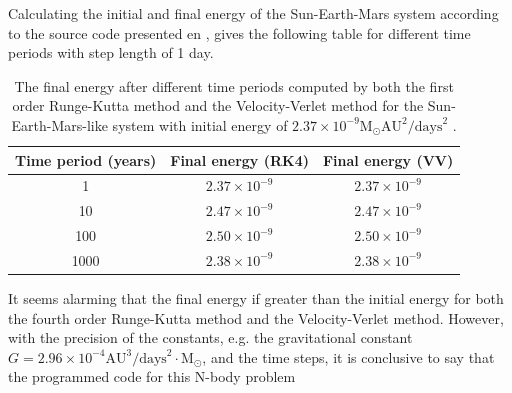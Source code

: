 Calculating the initial and final energy of the Sun-Earth-Mars system according to the source code presented en , gives the following table for different time periods with step length of 1 day.

\begin{table}[H]
\centering
\caption{The final energy after different time periods computed by both the first order Runge-Kutta method and the Velocity-Verlet method for the Sun-Earth-Mars-like system with initial energy of $2.37\times 10^{-9} \text{M}_{\odot} \text{AU}^2 /\text{days}^2$ .
}
\begin{center}
\begin{tabular}{ | c | c | c |  }
  \hline	
  Time period (years) & Final energy (RK4) & Final energy (VV)
  \\ \hline		
  1  & $2.37\times 10^{-9}$ & $2.37\times 10^{-9}$
  \\ \hline
  10  & $2.47\times 10^{-9}$ & $2.47\times 10^{-9}$
  \\ \hline
  100  & $2.50\times 10^{-9}$ & $2.50\times 10^{-9}$
  \\ \hline
  1000 & $2.38\times 10^{-9}$  & $2.38\times 10^{-9}$ 
  \\ \hline
\end{tabular}
\end{center}
\label{tab:SunEarthMarsTest_energy_conservation}
\end{table}
It seems alarming that the final energy if greater than the initial energy for both the fourth order Runge-Kutta method and the Velocity-Verlet method. 
However, with the precision of the constants, e.g. the gravitational constant $G=2.96\times 10^{-4} \text{AU}^3 / \text{days}^2 \cdot \text{M}_{\odot}$, and the time steps, it is conclusive to say that the programmed code for this N-body problem  